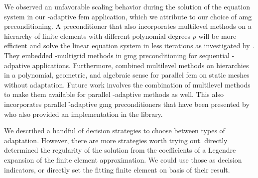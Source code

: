 We observed an unfavorable scaling behavior during the solution of the equation system in our \hp-adaptive \gls{fem} application, which we attribute to our choice of \gls{amg} preconditioning. A preconditioner that also incorporates multilevel methods on a hierarchy of finite elements with different polynomial degrees $p$ will be more efficient and solve the linear equation system in less iterations as investigated by \textcite{mitchell2010}. They embedded \p-multigrid methods in \gls{gmg} preconditioning for sequential \hp-adpative applications. Furthermore, \textcite{fehn2019} combined multilevel methods on hierarchies in a polynomial, geometric, and algebraic sense for parallel \gls{fem} on static meshes without adaptation. Future work involves the combination of multilevel methods to make them available for parallel \hp-adaptive methods as well.
This also incorporates parallel \h-adaptive \gls{gmg} preconditioners that have been presented by \textcite{clevenger2019} who also provided an implementation in the \dealii{} library.



We described a handful of decision strategies to choose between types of adaptation. However, there are more strategies worth trying out.
\textcite{houston2003,houston2005} directly determined the regularity of the solution from the coefficients of a Legendre expansion of the finite element approximation. We could use those as decision indicators, or directly set the fitting finite element on basis of their result.

